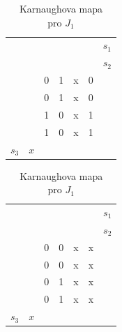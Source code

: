 \begin{table}[!htb]
\begin{minipage}{.5\linewidth}
      \caption{Karnaughova mapa\\ pro Y}
      \centering
    \begin{tabular}{lllllll}
      			       &       					 &       				 & \colorbox{yellow}{} &	\colorbox{yellow}{}&         &$s_1$ \\
    		 	       &        					&\colorbox{red}{}        & \colorbox{red}{}    & 				      &         &$s_2$     \\
    		 	       &        					& 0    				 & 1    				   & x     				& 0       &  \\
              	       & \colorbox{black}{}       & 0     				 & 1    				   & x   		  			& 0       &  \\
\colorbox{blue}{}& \colorbox{black}{}       & 1    				 & 0     				   & x     				& 1       &  \\
\colorbox{blue}{}&       					 & 1   				 & 0				  	   & x    					& 1       &  \\
    	  $ s_3$ 	& $x$  					&     				 &       				   &       				  	 &          &  \\
    \end{tabular}%
  \end{minipage}%
    \begin{minipage}{.5\linewidth}
      \centering
        \caption{Karnaughova mapa\\ pro $J_1$}
    \begin{tabular}{lllllll}
      			       &       					 &       				 & \colorbox{yellow}{} &	\colorbox{yellow}{}&         &$s_1$ \\
    		 	       &        					&\colorbox{red}{}        & \colorbox{red}{}    & 				      &         &$s_2$     \\
    		 	       &        					& 0    				 & 0    				   & x     				& x       &  \\
              	       & \colorbox{black}{}       & 0     				 & 0    				   & x   		  			& x       &  \\
\colorbox{blue}{}& \colorbox{black}{}       & 0    				 & 1     				   & x     				& x       &  \\
\colorbox{blue}{}&       					 & 0   				 & 1				  	   & x    					& x       &  \\
    	  $ s_3$ 	& $x$  					&     				 &       				   &       				  	 &          &  \\
    \end{tabular}%
  \end{minipage} 

   
  \label{tab:addlabel}%
\end{table}%


